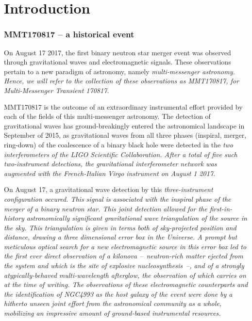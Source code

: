 \part{Introduction}

\section{MMT170817 -- a historical event}
On August 17 2017, the first binary neutron star merger event was observed through gravitational waves and electromagnetic signals. These observations pertain to a new paradigm of astronomy, namely \it{multi-messenger astronomy}. Hence, we will refer to the collection of these observations as MMT170817, for \it{Multi-Messenger Transient 170817}.

MMT170817 is the outcome of an extraordinary instrumental effort provided by each of the fields of this multi-messenger astronomy. The detection of gravitational waves has ground-breakingly entered the astronomical landscape in September of 2015, as gravitational waves from all three phases (inspiral, merger, ring-down) of the coalescence of a binary black hole were detected in the \it{two} interferometers of the LIGO Scientific Collaboration. After a total of five such two-instrument detections, the gravitational interferometer network was augmented with the French-Italian Virgo instrument on August 1 2017.

On August 17, a gravitational wave detection by this \it{three}-instrument configuration occured. This signal is associated with the inspiral phase of the merger of a binary neutron star. This joint detection allowed for the first-in-history astronomically significant gravitational wave triangulation of the source in the sky. This triangulation is given in terms both of sky-projected position and distance, drawing a three dimensional error box in the Universe. A prompt but meticulous optical search for a new electromagnetic source in this error box led to the first ever direct observation of a kilonova --~neutron-rich matter ejected from the system and which is the site of explosive nucleosynthesis~--, and of a strongly atypically-behaved multi-wavelength afterglow, the observation of which carries on at the time of writing. The observations of these electromagnetic counterparts and the identification of NGC4993 as the host galaxy of the event were done by a hitherto unseen joint effort from the astronomical community as a whole, mobilizing an impressive amount of ground-based instrumental resources.

